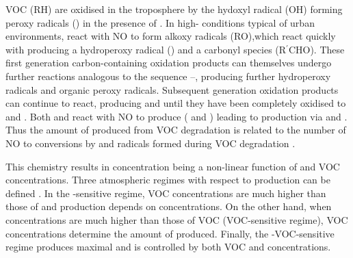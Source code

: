 VOC (RH) are oxidised in the troposphere by the hydoxyl radical (OH) forming peroxy radicals () in the presence of  . 
In high- conditions typical of urban environments,  react with NO  to form alkoxy radicals (RO),which react quickly with   producing a hydroperoxy radical () and a carbonyl species (R$^{\prime}$CHO).
These first generation carbon-containing oxidation products can themselves undergo further reactions analogous to the sequence --, producing further hydroperoxy radicals and organic peroxy radicals.
Subsequent generation oxidation products can continue to react, producing  and  until they have been completely oxidised to  and .
Both  and  react with NO to produce  ( and ) leading to  production via  and . 
Thus the amount of  produced from VOC degradation is related to the number of NO to  conversions by  and  radicals formed during VOC degradation \citep{Atkinson:2000}.
\begin{reactionlist}
\end{reactionlist}

This chemistry results in  concentration being a non-linear function of  and VOC concentrations.
Three atmospheric regimes with respect to  production can be defined \citep{Jenkin:2000}. 
In the -sensitive regime, VOC concentrations are much higher than those of  and  production depends on  concentrations. 
On the other hand, when  concentrations are much higher than those of VOC (VOC-sensitive regime), VOC concentrations determine the amount of  produced.
Finally, the -VOC-sensitive regime produces maximal  and is controlled by both VOC and  concentrations.

